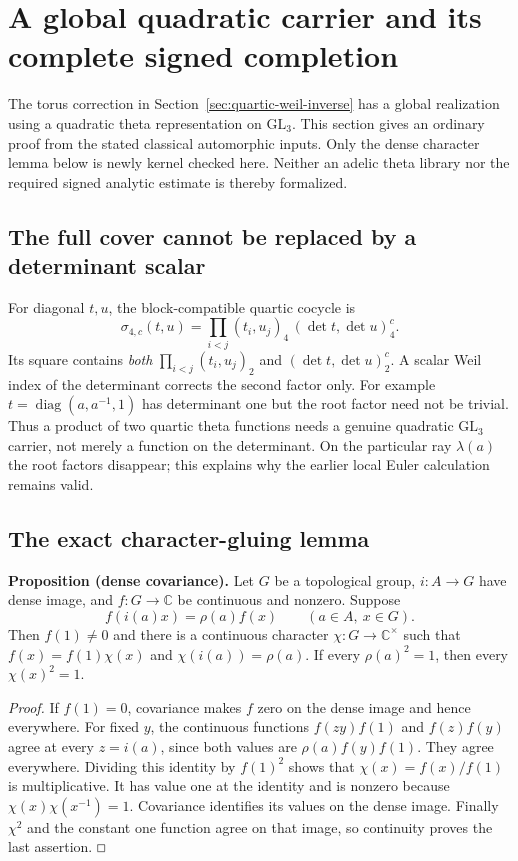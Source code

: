 \documentclass[11pt]{article}
\renewcommand{\square}{\mathord{\vcenter{\hrule\hbox{\vrule height .45em\kern .45em\vrule}\hrule}}}
\newcommand{\GL}{\mathrm{GL}}
\begin{document}
\section{A global quadratic carrier and its complete signed completion}
\label{sec:quadratic-global-carrier}

The torus correction in Section~\ref{sec:quartic-weil-inverse} has a
global realization using a quadratic theta representation on
$\GL_3$. This section gives an ordinary proof from the stated classical
automorphic inputs. Only the dense character lemma below is newly
kernel checked here. Neither an adelic theta library nor the required
signed analytic estimate is thereby formalized.

\subsection{The full cover cannot be replaced by a determinant scalar}
For diagonal $t,u$, the block-compatible quartic cocycle is
\[
 \sigma_{4,c}(t,u)=
 \prod_{i<j}(t_i,u_j)_4\,(\det t,\det u)_4^c.
\]
Its square contains \emph{both}
$\prod_{i<j}(t_i,u_j)_2$ and $(\det t,\det u)_2^c$.
A scalar Weil index of the determinant corrects the second factor only.
For example $t=\operatorname{diag}(a,a^{-1},1)$ has determinant one
but the root factor need not be trivial. Thus a product of two
quartic theta functions needs a genuine quadratic $\GL_3$ carrier,
not merely a function on the determinant. On the particular ray
$\lambda(a)$ the root factors disappear; this explains why the earlier
local Euler calculation remains valid.

\subsection{The exact character-gluing lemma}
\textbf{Proposition (dense covariance).}
Let $G$ be a topological group, $i:A\longrightarrow G$ have dense image,
and $f:G\longrightarrow\mathbb C$ be continuous and nonzero. Suppose
\[
 f(i(a)x)=\rho(a)f(x)\qquad(a\in A,\ x\in G).
\]
Then $f(1)\ne0$ and there is a continuous character $\chi:G\to
\mathbb C^\times$ such that
$f(x)=f(1)\chi(x)$ and $\chi(i(a))=\rho(a)$.
If every $\rho(a)^2=1$, then every $\chi(x)^2=1$.

\emph{Proof.}
If $f(1)=0$, covariance makes $f$ zero on the dense image and hence
everywhere. For fixed $y$, the continuous functions
$f(zy)f(1)$ and $f(z)f(y)$ agree at every $z=i(a)$, since both values
are $\rho(a)f(y)f(1)$. They agree everywhere. Dividing this identity
by $f(1)^2$ shows that $\chi(x)=f(x)/f(1)$ is multiplicative.
It has value one at the identity and is nonzero because
$\chi(x)\chi(x^{-1})=1$. Covariance identifies its values on the
dense image. Finally $\chi^2$ and the constant one function agree on
that image, so continuity proves the last assertion. $\square$
\end{document}

